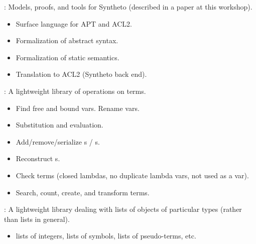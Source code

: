 
\begin{frame}

\newlibtitle

:
Models, proofs, and tools for Syntheto (described in a paper at this workshop).
\begin{itemize}
\item Surface language for APT and ACL2.
\item Formalization of abstract syntax.
\item Formalization of static semantics.
\item Translation to ACL2 (Syntheto back end).
\end{itemize}

\end{frame}


\begin{frame}

\newlibtitle

:
A lightweight library of operations on terms.
\begin{itemize}
\item Find free and bound vars.  Rename vars.
\item Substitution and evaluation.
\item Add/remove/serialize s / s.
\item Reconstruct s.
\item Check terms (closed lambdas, no duplicate lambda vars,  not used
      as a var).
\item Search, count, create, and transform terms.
\end{itemize}

\end{frame}


\begin{frame}

\newlibtitle

:
A lightweight library dealing with lists of objects of particular
types (rather than lists in general).
\begin{itemize}
\item lists of integers, lists of symbols, lists of pseudo-terms, etc.
\end{itemize}

\end{frame}

